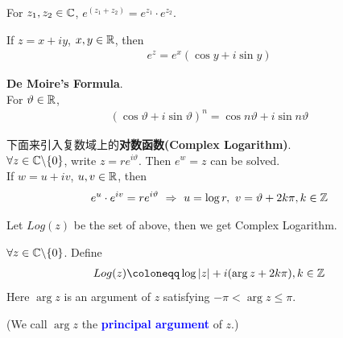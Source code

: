 	\vspace{2em}
	\begin{proposition}\label{prop 3.1.1}
		For $z_1 , z_2 \in \mathbb{C}$, $e^{(z_1 + z_2)} = e^{z_1} \cdot e^{z_2}$.
	\end{proposition}
	
	\vspace{2em}
	\begin{corollary}\label{cor 3.1.5}
		If $z = x + iy$, $x , y \in \mathbb{R}$, then
		\begin{align}
			e^z = e^x (\cos{y} + i\sin{y})
		\end{align}
	\end{corollary}
	
	\vspace{2em}
	\begin{corollary}\label{cor 3.1.6}
		\textbf{De Moire's Formula}.\\
		For $\vartheta \in \mathbb{R}$,
		\begin{align}
			(\cos{\vartheta} + i\sin{\vartheta})^n = \cos{n\vartheta} + i\sin{n\vartheta}
		\end{align}
	\end{corollary}

	\vspace{2em}
	下面来引入复数域上的\textbf{对数函数(Complex Logarithm)}.\\
	$\forall z \in \mathbb{C} \backslash \{ 0 \}$, write $z = r e^{i\vartheta}$. Then $e^w = z$ can be solved.\\
	If $w = u + iv$, $u , v \in \mathbb{R}$, then
	\begin{align}
		e^u \cdot e^{iv} = r e^{i\vartheta} \,\, \Rightarrow \,\, u = \log{r} , \,\, v = \vartheta + 2k\pi , k \in \mathbb{Z}
	\end{align}

	Let $Log(z)$ be the set of above, then we get Complex Logarithm.
	
	\begin{defn}\label{def 3.1.2}
		$\forall z \in \mathbb{C} \backslash \{ 0 \}$. Define
		\begin{align}
			Log(z) \coloneqq \log{\left| z \right|} + i(\arg{z} + 2k\pi) , k \in \Z
		\end{align}
		Here $\arg{z}$ is an argument of $z$ satisfying $-\pi < \arg{z} \leq \pi$.
		\begin{center}
			(We call $\arg{z}$ the \textcolor{blue}{\textbf{principal argument}} of $z$.) 
		\end{center}
	\end{defn}

